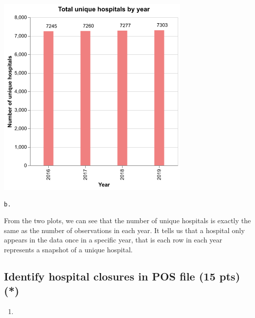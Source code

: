 \documentclass[
  letterpaper,
  DIV=11,
  numbers=noendperiod]{scrartcl}
\providecommand{\tightlist}{%
  \setlength{\itemsep}{0pt}\setlength{\parskip}{0pt}}\usepackage{longtable,booktabs,array}
\begin{document}
\includegraphics[width=3.72917in,height=3.92708in]{pset4_template_files/figure-pdf/cell-6-output-1.png}

\begin{verbatim}
b. 
\end{verbatim}

From the two plots, we can see that the number of unique hospitals is
exactly the same as the number of observations in each year. It tells us
that a hospital only appears in the data once in a specific year, that
is each row in each year represents a snapshot of a unique hospital.

\subsection{Identify hospital closures in POS file (15 pts)
(*)}\label{identify-hospital-closures-in-pos-file-15-pts}

\begin{enumerate}
\def\labelenumi{\arabic{enumi}.}
\tightlist
\item
\end{enumerate}
\end{document}
